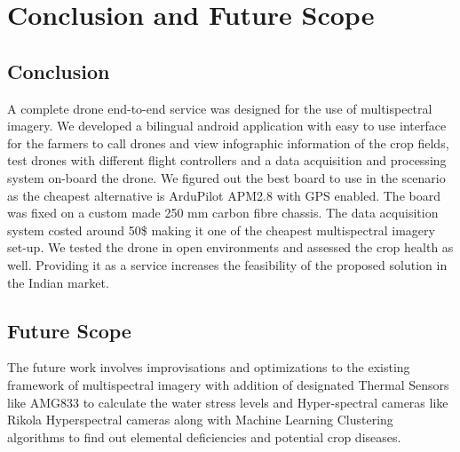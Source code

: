 \chapter{Conclusion and Future Scope}
\section{Conclusion}
A complete drone end-to-end service was designed for the use of multispectral imagery. We developed a bilingual android application with easy to use interface for the farmers to call drones and view infographic information of the crop fields, test drones with different flight controllers and a data acquisition and processing system on-board the drone. We figured out the best board to use in the scenario as the cheapest alternative is ArduPilot APM2.8 with GPS enabled. The board was fixed on a custom made 250 mm carbon fibre chassis. The data acquisition system costed around 50\$ making it one of the cheapest multispectral imagery set-up. We tested the drone in open environments and assessed the crop health as well. Providing it as a service increases the feasibility of the proposed solution in the Indian market.
\section{Future Scope}
The future work involves improvisations and optimizations to the existing framework of multispectral imagery with addition of designated Thermal Sensors like AMG833 to calculate the water stress levels and Hyper-spectral cameras like Rikola Hyperspectral cameras along with Machine Learning Clustering algorithms to find out elemental deficiencies and potential crop diseases.

